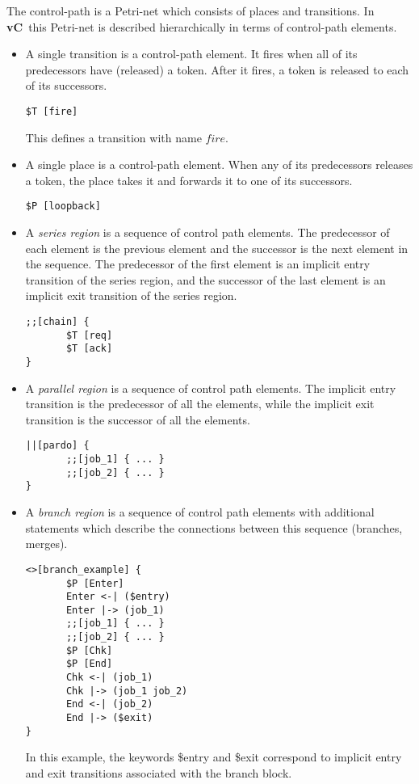 \documentclass{article}
\newcommand{\vC}{{\bf vC}~}
\begin{document}
The control-path is a Petri-net which consists of
places and transitions.  In \vC this Petri-net
is described hierarchically in terms of 
control-path elements. 
\begin{itemize}
\item A single transition is a control-path element. It
fires when all of its predecessors have (released) a token.
After it fires, a token is released to each of
its successors.
\begin{verbatim}
$T [fire]
\end{verbatim}
This defines a transition with name $fire$. 
\item A single place is a control-path element.  When
any of its predecessors releases a token, the place
takes it and forwards it to one of its successors.
\begin{verbatim}
$P [loopback]
\end{verbatim}
\item A {\em series region} is a sequence of control
path elements.  The predecessor of each element is
the previous element and the successor is the next
element in the sequence.  
The predecessor of
the first element is an implicit entry transition
of the series region, and the successor of the last
element is an implicit exit transition of
the series region.
\begin{verbatim}
;;[chain] {
       $T [req]
       $T [ack]
}
\end{verbatim}
\item A {\em parallel region} is a sequence of control
path elements.  The implicit entry transition
is the predecessor of all the elements, while the
implicit exit transition is the successor of
all the elements.
\begin{verbatim}
||[pardo] {
       ;;[job_1] { ... }
       ;;[job_2] { ... }
}
\end{verbatim}
\item A {\em branch region} is a sequence of control
path elements with additional statements which describe
the connections between this sequence (branches, merges).
\begin{verbatim}
<>[branch_example] {
       $P [Enter]
       Enter <-| ($entry)
       Enter |-> (job_1)
       ;;[job_1] { ... }
       ;;[job_2] { ... }
       $P [Chk]
       $P [End]
       Chk <-| (job_1)
       Chk |-> (job_1 job_2)
       End <-| (job_2)
       End |-> ($exit)
}
\end{verbatim}
In this example, the keywords \$entry and \$exit correspond
to implicit entry and exit transitions associated with the branch block.

\end{itemize}
\end{document}
